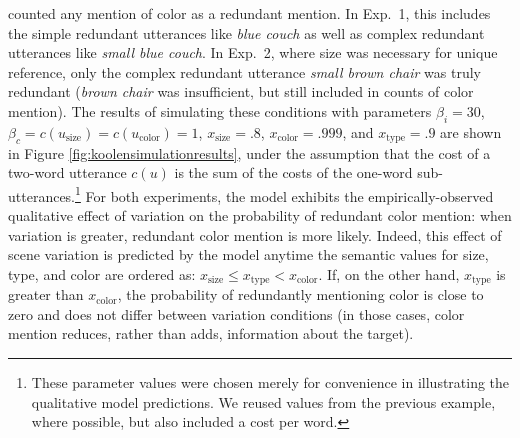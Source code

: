 \documentclass[11pt]{article}
\newcommand{\figref}[1]{Figure \ref{#1}}
\begin{document}
 counted any mention of color as a redundant mention. In Exp.~1, this includes the simple redundant utterances like \emph{blue couch} as well as complex redundant utterances like \emph{small blue couch}. In Exp.~2, where size was necessary for unique reference, only the complex redundant utterance \emph{small brown chair} was truly redundant (\emph{brown chair} was insufficient, but still included in counts of color mention).  The results of simulating these conditions with parameters $\beta_i = 30$, $ \beta_c = c(u_{\textrm{size}}) = c(u_{\textrm{color}}) = 1$, $x_{\text{size}} = .8$, $x_{\text{color}} = .999$, and $x_{\text{type}} = .9$ are shown in \figref{fig:koolensimulationresults}, under the assumption that the cost of a two-word utterance $c(u)$ is the sum of the costs of the one-word sub-utterances.\footnote{These parameter values were chosen merely for convenience in illustrating the qualitative model predictions. We reused values from the previous example, where possible, but also included a cost per word.}
For both experiments, the model exhibits the empirically-observed qualitative effect of variation on the probability of redundant color mention: when variation is greater, redundant color mention is more likely. 
Indeed, this effect of scene variation is predicted by the model anytime the semantic values for size, type, and color are ordered as: $x_{\text{size}} \leq  x_{\text{type}} < x_{\text{color}}$. If, on the other hand, $x_{\text{type}}$ is greater than $x_{\text{color}}$, the probability of redundantly mentioning color is close to zero and does not differ between variation conditions (in those cases, color mention reduces, rather than adds, information about the target). 
\end{document}
